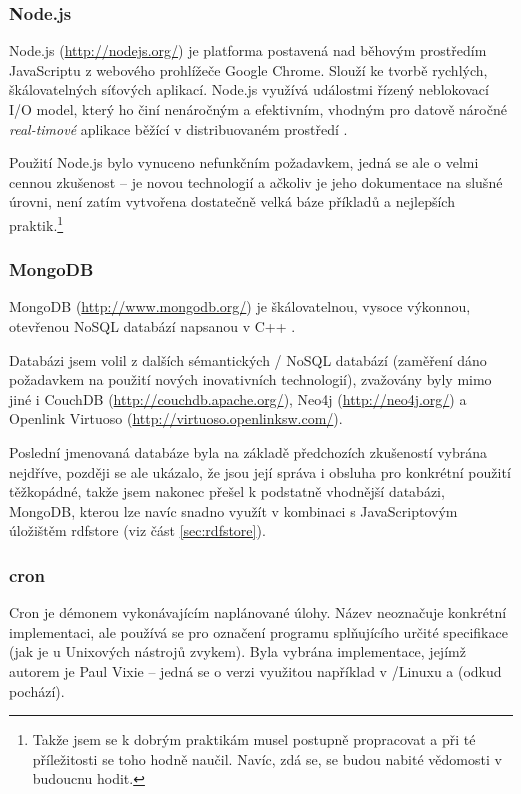\subsubsection{Node.js}
Node.js (\url{http://nodejs.org/}) je platforma postavená nad běhovým prostředím JavaScriptu z webového prohlížeče Google Chrome. Slouží ke tvorbě rychlých, škálovatelných síťových aplikací. Node.js využívá událostmi řízený neblokovací I/O model, který ho činí nenáročným a efektivním, vhodným pro datově náročné \textit{real-timové} aplikace běžící v distribuovaném prostředí \cite{Node}.

Použití Node.js bylo vynuceno nefunkčním požadavkem, jedná se ale o velmi cennou zkušenost -- je novou technologií a ačkoliv je jeho dokumentace na slušné úrovni, není zatím vytvořena dostatečně velká báze příkladů a nejlepších praktik.\footnote{Takže jsem se k dobrým praktikám musel postupně propracovat a při té příležitosti se toho hodně naučil. Navíc, zdá se, se budou nabité vědomosti v budoucnu hodit.}

\subsubsection{MongoDB}
MongoDB (\url{http://www.mongodb.org/}) je škálovatelnou, vysoce výkonnou, otevřenou NoSQL databází napsanou v C++ \cite{Mongo}.

Databázi jsem volil z dalších sémantických / NoSQL databází (zaměření dáno požadavkem na použití nových inovativních technologií), zvažovány byly mimo jiné i CouchDB (\url{http://couchdb.apache.org/}), Neo4j (\url{http://neo4j.org/}) a Openlink Virtuoso (\url{http://virtuoso.openlinksw.com/}).

Poslední jmenovaná databáze byla na základě předchozích zkušeností vybrána nejdříve, později se ale ukázalo, že jsou její správa i obsluha pro konkrétní použití těžkopádné, takže jsem nakonec přešel k podstatně vhodnější databázi, MongoDB, kterou lze navíc snadno využít v kombinaci s JavaScriptovým  úložištěm rdfstore (viz část \ref{sec:rdfstore}).

\subsubsection{cron}
Cron je démonem vykonávajícím naplánované úlohy. Název neoznačuje konkrétní implementaci, ale používá se pro označení programu splňujícího určité specifikace (jak je u Unixových nástrojů zvykem). Byla vybrána implementace, jejímž autorem je Paul Vixie -- jedná se o verzi využitou například v /Linuxu a  (odkud pochází).


